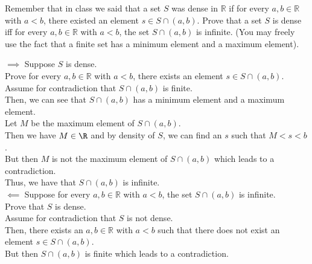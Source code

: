 \documentclass[answers,12pt,addpoints]{exam}
\begin{document}
\begin{questions}
    \question Remember that in class we said that a set $S$ was dense in $\mathbb{R}$ if for every $a, b \in \mathbb{R}$ with $a < b$, there existed an element $s \in S \cap (a, b)$. Prove that a set $S$ is dense iff for every $a, b \in \mathbb{R}$ with $a < b$, the set $S \cap (a, b)$ is infinite. (You may freely use the fact that a finite set has a minimum element and a maximum element).
    \begin{solution}
        $\implies$ Suppose $S$ is dense. \\
        Prove for every $a, b \in \mathbb{R}$ with $a < b$, there exists an element $s \in S \cap (a, b)$. \\
        Assume for contradiction that $S \cap (a, b)$ is finite. \\
        Then, we can see that $S \cap (a, b)$ has a minimum element and a maximum element. \\
        Let $M$ be the maximum element of $S \cap (a, b)$. \\
        Then we have $M \in \R$ and by density of $S$, we can find an $s$ such that $M < s < b$. \\
        But then $M$ is not the maximum element of $S \cap (a, b)$ which leads to a contradiction. \\
        Thus, we have that $S \cap (a, b)$ is infinite. \\
        $\impliedby$ Suppose for every $a, b \in \mathbb{R}$ with $a < b$, the set $S \cap (a, b)$ is infinite. \\
        Prove that $S$ is dense. \\
        Assume for contradiction that $S$ is not dense. \\
        Then, there exists an $a, b \in \mathbb{R}$ with $a < b$ such that there does not exist an element $s \in S \cap (a, b)$. \\
        But then $S \cap (a, b)$ is finite which leads to a contradiction. \\
    \end{solution}




\end{questions}
\end{document}
